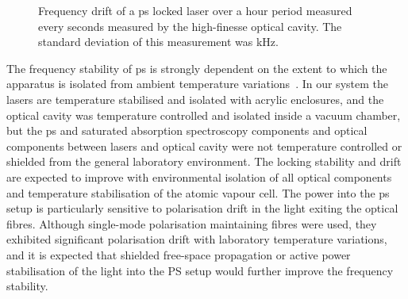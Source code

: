 \begin{figure}
\center

\caption[Long-term frequency drift of a laser locked with polarisation spectroscopy.]{Frequency drift of a \gls{ps} locked laser over a \unit[60]{hour} period measured every \unit[10]{seconds} measured by the high-finesse optical cavity. The standard deviation of this measurement was \unit[51]{kHz}.}
\label{figure:ps_drift}
\end{figure}

The frequency stability of \gls{ps} is strongly dependent on the extent to which the apparatus is isolated from ambient temperature variations~\cite{yoshikawa_frequency_2003}.
In our system the lasers are temperature stabilised and isolated with acrylic enclosures, and the optical cavity was temperature controlled and isolated inside a vacuum chamber, but the \gls{ps} and saturated absorption spectroscopy components and optical components between lasers and optical cavity were not temperature controlled or shielded from the general laboratory environment.
The locking stability and drift are expected to improve with environmental isolation of all optical components and temperature stabilisation of the atomic vapour cell.
The power into the \gls{ps} setup is particularly sensitive to polarisation drift in the light exiting the optical fibres.
Although single-mode polarisation maintaining fibres were used, they exhibited significant polarisation drift with laboratory temperature variations, and it is expected that shielded free-space propagation or active power stabilisation of the light into the PS setup would further improve the frequency stability.